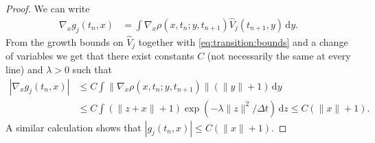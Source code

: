 \documentclass[10pt,a4paper]{amsart}
\newcommand{\diff}{\, \mathrm{d}}
\begin{document}
\begin{proof}
  We can write
  \begin{align*}
    \nabla_x g_j(t_{n},x) & = \int \nabla_x \rho(x,t_n;y,t_{n+1}) \widehat{V}_j(t_{n+1},y) \diff y.
  \end{align*}
  From the growth bounds on $\widehat{V}_j$ together with \cref{eq:transition:bounds} and a change of variables we get that there exist constants $C$ (not necessarily the same at every line) and $\lambda > 0$ such that
  \begin{align*}
    \left | \nabla_x g_j(t_{n},x) \right |
     & \leq
    C \int \|\nabla_x \rho(x,t_n;y,t_{n+1})\| (\|y\|+1) \diff y
    \\
     & \leq
    C \int (\|z+x\|+1) \exp(-\lambda\|z\|^2/\Delta t) \diff z
    \leq
    C (\|x\|+1).
  \end{align*}
  A similar calculation shows that $|g_j(t_{n},x)| \leq C(\|x\|+1)$.
\end{proof}
\end{document}
